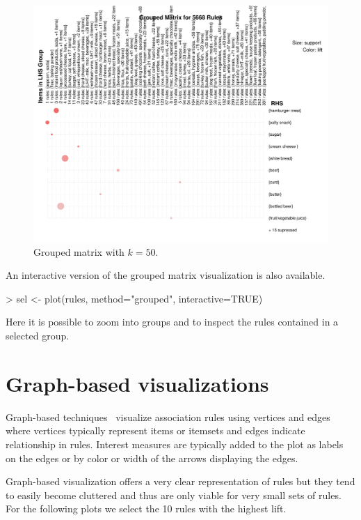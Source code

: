 \documentclass[nojss]{jss}
\begin{document}
\begin{figure}
\centering
\includegraphics[width=20cm, angle=90]{arulesViz-clusterplot2}
\caption{Grouped matrix with $k=50$.\label{fig:clusterplot2}}
\end{figure}


An interactive version of the grouped matrix visualization is also available.

\begin{Schunk}
\begin{Sinput}
> sel <- plot(rules, method="grouped", interactive=TRUE)
\end{Sinput}
\end{Schunk}

Here it is possible to zoom into groups and to inspect
the rules contained in a selected group.

\section{Graph-based visualizations}

Graph-based techniques~\citep{arulesViz:Klemettinen:1994,arulesViz:Rainsford:2000,arulesViz:Buono:2005,arulesViz:Ertek:2006} visualize association rules
using vertices and edges where vertices typically represent items
or itemsets and edges indicate relationship in rules. Interest measures are
typically added to the plot as labels on the edges or by color or width of
the arrows displaying the edges.

Graph-based visualization offers a very clear representation of rules but they
tend to
easily become cluttered and thus are only viable for very small sets of rules.
For the following plots we select the 10 rules with the highest lift.
\end{document}
